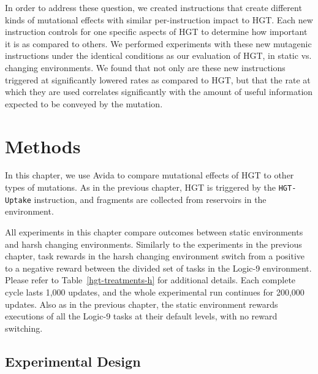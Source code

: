 \documentclass[PhD]{msu-thesis}
\begin{document}
In order to address these question, we created instructions that create different kinds of mutational effects with similar per-instruction impact to HGT.
Each new instruction controls for one specific aspects of HGT to determine how important it is as compared to others.
We performed experiments with these new mutagenic instructions under the identical conditions as our evaluation of HGT, in static vs. changing environments. We found that not only are these new instructions triggered at significantly lowered rates as compared to HGT, but that the rate at which they are used correlates significantly with the amount of useful information expected to be conveyed by the mutation. 


\section{Methods}
In this chapter, we use Avida to compare mutational effects of HGT to other types of mutations. As in the previous chapter, HGT is triggered by the \texttt{HGT-Uptake} instruction, and fragments are collected from reservoirs in the environment. 

All experiments in this chapter compare outcomes between static environments and harsh changing environments. Similarly to the experiments in the previous chapter, task rewards in the harsh changing environment switch from a positive to a negative reward between the divided set of tasks in the Logic-9 environment. Please refer to Table~\ref{hgt-treatments-h} for additional details. Each complete cycle lasts 1,000 updates, and the whole experimental run continues for 200,000 updates.
Also as in the previous chapter, the static environment rewards executions of all the Logic-9 tasks at their default levels, with no reward switching.

\subsection{Experimental Design}

\end{document}
